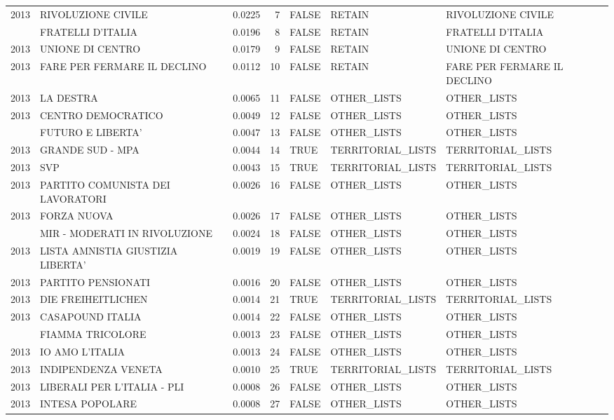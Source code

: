\begin{longtable}[t]{rlrrlll}
2013 & RIVOLUZIONE CIVILE & 0.0225 & 7 & FALSE & RETAIN & RIVOLUZIONE CIVILE\\
\addlinespace
2013 & FRATELLI D'ITALIA & 0.0196 & 8 & FALSE & RETAIN & FRATELLI D'ITALIA\\
2013 & UNIONE DI CENTRO & 0.0179 & 9 & FALSE & RETAIN & UNIONE DI CENTRO\\
2013 & FARE PER FERMARE IL DECLINO & 0.0112 & 10 & FALSE & RETAIN & FARE PER FERMARE IL DECLINO\\
2013 & LA DESTRA & 0.0065 & 11 & FALSE & OTHER\_LISTS & OTHER\_LISTS\\
2013 & CENTRO DEMOCRATICO & 0.0049 & 12 & FALSE & OTHER\_LISTS & OTHER\_LISTS\\
\addlinespace
2013 & FUTURO E LIBERTA' & 0.0047 & 13 & FALSE & OTHER\_LISTS & OTHER\_LISTS\\
2013 & GRANDE SUD - MPA & 0.0044 & 14 & TRUE & TERRITORIAL\_LISTS & TERRITORIAL\_LISTS\\
2013 & SVP & 0.0043 & 15 & TRUE & TERRITORIAL\_LISTS & TERRITORIAL\_LISTS\\
2013 & PARTITO COMUNISTA DEI LAVORATORI & 0.0026 & 16 & FALSE & OTHER\_LISTS & OTHER\_LISTS\\
2013 & FORZA NUOVA & 0.0026 & 17 & FALSE & OTHER\_LISTS & OTHER\_LISTS\\
\addlinespace
2013 & MIR - MODERATI IN RIVOLUZIONE & 0.0024 & 18 & FALSE & OTHER\_LISTS & OTHER\_LISTS\\
2013 & LISTA AMNISTIA GIUSTIZIA LIBERTA' & 0.0019 & 19 & FALSE & OTHER\_LISTS & OTHER\_LISTS\\
2013 & PARTITO PENSIONATI & 0.0016 & 20 & FALSE & OTHER\_LISTS & OTHER\_LISTS\\
2013 & DIE FREIHEITLICHEN & 0.0014 & 21 & TRUE & TERRITORIAL\_LISTS & TERRITORIAL\_LISTS\\
2013 & CASAPOUND ITALIA & 0.0014 & 22 & FALSE & OTHER\_LISTS & OTHER\_LISTS\\
\addlinespace
2013 & FIAMMA TRICOLORE & 0.0013 & 23 & FALSE & OTHER\_LISTS & OTHER\_LISTS\\
2013 & IO AMO L'ITALIA & 0.0013 & 24 & FALSE & OTHER\_LISTS & OTHER\_LISTS\\
2013 & INDIPENDENZA VENETA & 0.0010 & 25 & TRUE & TERRITORIAL\_LISTS & TERRITORIAL\_LISTS\\
2013 & LIBERALI PER L'ITALIA - PLI & 0.0008 & 26 & FALSE & OTHER\_LISTS & OTHER\_LISTS\\
2013 & INTESA POPOLARE & 0.0008 & 27 & FALSE & OTHER\_LISTS & OTHER\_LISTS\\

\end{longtable}
